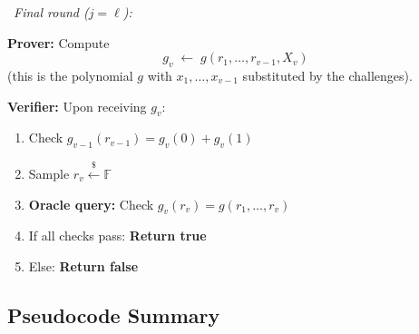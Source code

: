 \documentclass[11pt]{article}
\theoremstyle{plain}
\theoremstyle{definition}
\newcommand{\F}{\mathbb{F}}
\begin{document}
\begin{tcolorbox}[colback=gray!5, colframe=gray!50, title={Sumcheck Protocol (full description)}]
\begin{center}
\end{center}

\bigskip
\dotfill\ \textit{Final round ($j = \ell$):} \dotfill

\bigskip
\textbf{Prover:} Compute
\[
  g_v \;\leftarrow\; g(r_1, \ldots, r_{v-1}, X_v)
\]
(this is the polynomial $g$ with $x_1,\ldots,x_{v-1}$ substituted by the challenges).

\textbf{Verifier:} Upon receiving $g_v$:
\begin{enumerate}
  \item Check $g_{v-1}(r_{v-1}) = g_v(0) + g_v(1)$
  \item Sample $r_v \xleftarrow{\$} \F$
  \item \textbf{Oracle query:} Check $g_v(r_v) = g(r_1, \ldots, r_v)$
  \item If all checks pass: \textbf{Return true}
  \item Else: \textbf{Return false}
\end{enumerate}
\end{tcolorbox}

\subsection{Pseudocode Summary}
\end{document}
